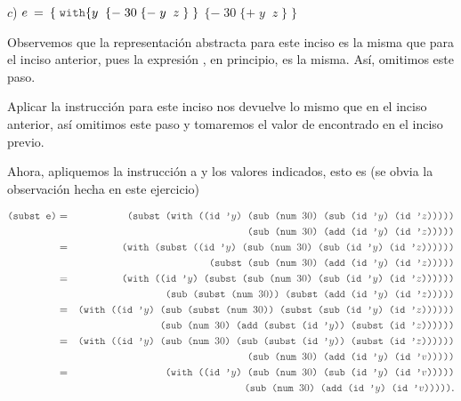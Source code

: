 \vspace*{0.3cm}
$c$) $e\: =\: \{\; \code{with} \{y\;\; \{-\; 30\; \{-\; y\;\; z\; \}\; \} $ \newline
\hspace*{1.5cm} $\{-\; 30\; \{+\; y\;\; z\; \}\; \}$                        \newline
\hspace*{0.3cm}                          \newline

\hspace*{0.3cm} Observemos que la representación abstracta para este inciso es la
misma que para el inciso anterior, pues la expresión , en principio,
es la misma. Así, omitimos este paso.
\newline

Aplicar la instrucción  para este inciso nos devuelve lo mismo que en
el inciso anterior, así omitimos este paso y tomaremos el valor de 
encontrado en el inciso previo.
\newline

Ahora, apliquemos la instrucción  a  y los valores indicados,
esto es (se obvia la observación hecha en este ejercicio)

\begin{eqnarray*}
  \code{(subst e)} &=& \code{(subst (with ((id '$y$) (sub (num $30$) (sub (id '$y$) (id '$z$)))))}\\
  & & \code{(sub (num $30$) (add (id '$y$) (id '$z$)))))}\\
  &=& \code{(with (subst ((id '$y$) (sub (num $30$) (sub (id '$y$) (id '$z$))))))}\\
  & & \code{(subst (sub (num $30$) (add (id '$y$) (id '$z$)))))}\\
  &=& \code{(with ((id '$y$) (subst (sub (num $30$) (sub (id '$y$) (id '$z$))))))}\\
  & & \code{(sub (subst (num $30$)) (subst (add (id '$y$) (id '$z$)))))}\\
  &=& \code{(with ((id '$y$) (sub (subst (num $30$)) (subst (sub (id '$y$) (id '$z$))))))}\\
  & & \code{(sub (num $30$) (add (subst (id '$y$)) (subst (id '$z$))))))}\\
  &=& \code{(with ((id '$y$) (sub (num $30$) (sub (subst (id '$y$)) (subst (id '$z$))))))}\\
  & & \code{(sub (num $30$) (add (id '$y$) (id '$v$)))))}\\
  &=& \code{(with ((id '$y$) (sub (num $30$) (sub (id '$y$) (id '$v$)))))}\\
  & & \code{(sub (num $30$) (add (id '$y$) (id '$v$)))))}.
\end{eqnarray*}


